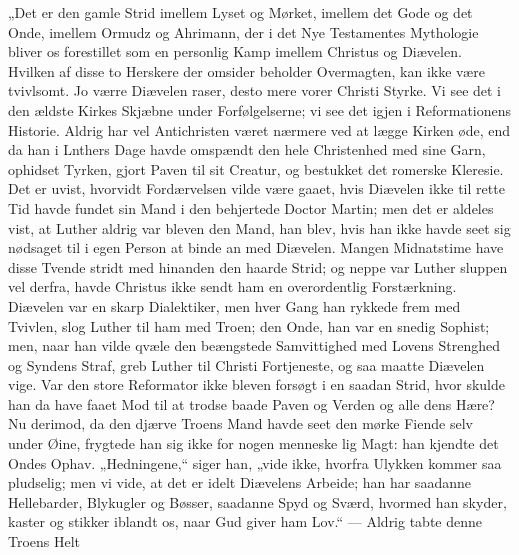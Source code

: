 \documentclass[12pt,a4paper]{book}
\begin{document}
„Det er den gamle Strid imellem Lyset og Mørket, imellem det Gode og det Onde, imellem
Ormudz og Ahrimann, der i det Nye Testamentes Mythologie bliver os forestillet som en
personlig Kamp imellem Christus og Diævelen. Hvilken af disse to Herskere der omsider
beholder Overmagten, kan ikke være tvivlsomt. Jo værre Diævelen raser, desto mere
vorer Christi Styrke. Vi see det i den ældste Kirkes Skjæbne under Forfølgelserne; vi see
det igjen i Reformationens Historie. Aldrig har vel Antichristen været nærmere ved at
lægge Kirken øde, end da han i Lnthers Dage havde omspændt den hele Christenhed med sine
Garn, ophidset Tyrken, gjort Paven til sit Creatur, og bestukket det romerske Kleresie.
Det er uvist, hvorvidt Fordærvelsen vilde være gaaet, hvis Diævelen ikke til rette Tid
havde fundet sin Mand i den behjertede Doctor Martin; men det er aldeles vist, at Luther
aldrig var bleven den Mand, han blev, hvis han ikke havde seet sig nødsaget til i egen
Person at binde an med Diævelen. Mangen Midnatstime have disse Tvende stridt med hinanden
den haarde Strid; og neppe var Luther sluppen vel derfra, havde Christus ikke sendt ham en
overordentlig Forstærkning. Diævelen var en skarp Dialektiker, men hver Gang han rykkede
frem med Tvivlen, slog Luther til ham med Troen; den Onde, han var en snedig Sophist; men,
naar han vilde qvæle den beængstede Samvittighed med Lovens Strenghed og Syndens Straf,
greb Luther til Christi Fortjeneste, og saa maatte Diævelen vige. Var den store Reformator
ikke bleven forsøgt i en saadan Strid, hvor skulde han da have faaet Mod til at trodse
baade Paven og Verden og alle dens Hære? Nu derimod, da den djærve Troens Mand havde seet
den mørke Fiende selv under Øine, frygtede han sig ikke for nogen menneske\-%
lig Magt: han kjendte det Ondes Ophav. „Hedningene,“ siger han, „vide ikke, hvorfra
Ulykken kommer saa pludselig; men vi vide, at det er idelt Diævelens Arbeide; han har
saadanne Hellebarder, Blykugler og Bøsser, saadanne Spyd og Sværd, hvormed han skyder,
kaster og stikker iblandt os, naar Gud giver ham Lov.“ --- Aldrig tabte denne Troens Helt
\end{document}

